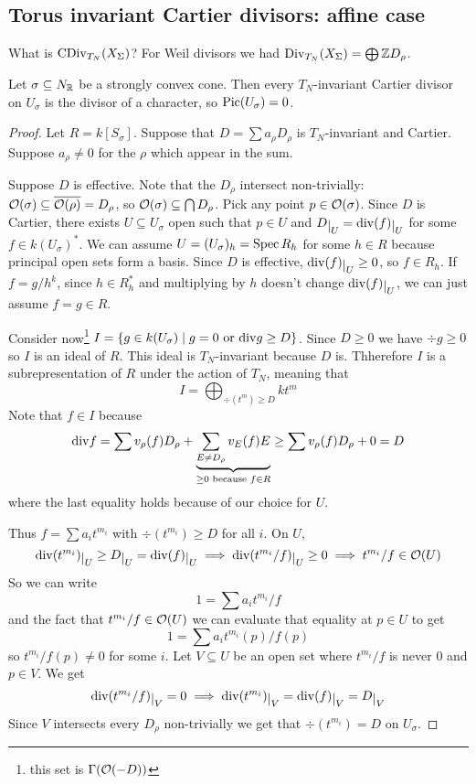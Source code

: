 \subsection{Torus invariant Cartier divisors: affine case}
What is $\operatorname{CDiv}_{T_N}(X_\Sigma)$? For Weil divisors we had $\operatorname{Div}_{T_N}(X_\Sigma)=\bigoplus \mathbb{Z} D_\rho$.

\begin{proposition}[]\label{PrInvariantCartierDivisorsOnAffineArePrincipalAndComeFromCharacters}
Let $\sigma\subseteq N_{\mathbb{R}}$ be a strongly convex cone. Then every $T_N$-invariant Cartier divisor on $U_\sigma$ is the divisor of a character, so $\operatorname{Pic}(U_\sigma)=0$.
\end{proposition}
\begin{proof}
Let $R=k[S_\sigma]$. Suppose that $D=\sum a_\rho D_\rho$ is $T_N$-invariant and Cartier. Suppose $a_\rho\neq 0$ for the $\rho$ which appear in the sum.

Suppose $D$ is effective. Note that the $D_\rho$ intersect non-trivially: $\mathcal{O}(\sigma)\subseteq \overline{\mathcal{O}(\rho)}=D_\rho$, so $\mathcal{O}(\sigma)\subseteq \bigcap D_\rho$. Pick any point $p\in \mathcal{O}(\sigma)$. Since $D$ is Cartier, there exists $U\subseteq U_\sigma$ open such that $p\in U$ and $D\res U=\div(f)\res U$ for some $f\in k(U_\sigma)^\ast$. We can assume $U=(U_\sigma)_h=\operatorname{Spec} R_h$ for some $h\in R$ because principal open sets form a basis. Since $D$ is effective, $\div(f)\res U\geq 0$, so $f\in R_h$. If $f=g/h^k$, since $h\in R_h^\ast$ and multiplying by $h$ doesn't change $\div(f)\res U$, we can just assume $f=g\in R$.

Consider now\footnote{this set is $\Gamma(\mathcal{O}(-D))$} $I=\left\{{g\in k(U_\sigma)\mid g=0\text{ or }\mathrm{div} g\geq D}\right\}$. Since $D\geq 0$ we have $\div g\geq 0$ so $I$ is an ideal of $R$. This ideal is $T_N$-invariant because $D$ is. Thherefore $I$ is a subrepresentation of $R$ under the action of $T_N$, meaning that 
\[I=\bigoplus_{\div (t^m)\geq D} kt^m\]
Note that $f\in I$ because
\[\mathrm{div} f=\sum v_\rho(f)D_\rho+\underset{\geq 0\text{ because }f\in R}{\underbrace{\sum_{E\neq D_\rho}v_E(f)E}}\geq \sum v_\rho(f)D_\rho+0=D\]
where the last equality holds because of our choice for $U$.

Thus $f=\sum a_{i}t^{m_i}$ with $\div(t^{m_i})\geq D$ for all $i$. On $U$, 
\[\div(t^{m_i})\res U\geq D\res U=\div(f)\res U\implies \div(t^{m_i}/f)\res U\geq 0\implies t^{m_i}/f\in \Oc(U)\]
So we can write
\[1=\sum a_i t^{m_i}/f\]
and the fact that $t^{m_i}/f\in \mathcal{O}(U)$ we can evaluate that equality at $p\in U$ to get
\[1=\sum a_i t^{m_i}(p)/f(p)\]
so $t^{m_i}/f(p) \neq 0$ for some $i$. Let $V\subseteq U$ be an open set where $t^{m_i}/f$ is never $0$ and $p\in V$. We get
\[\div(t^{m_i}/f)\res V=0\implies \div(t^{m_i})\res V=\div (f)\res V=D\res V\]
Since $V$ intersects every $D_\rho$ non-trivially we get that $\div(t^{m_i})=D$ on $U_\sigma$.


\end{proof}

